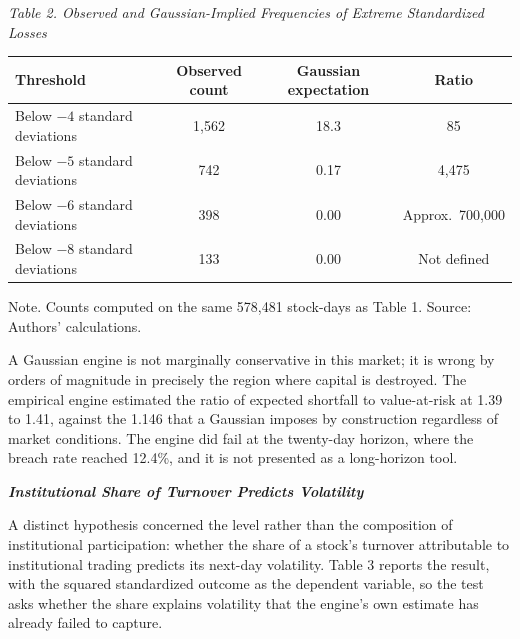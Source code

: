 \documentclass[12pt]{article}
\begin{document}
\begin{table}[htbp]
\centering
\emph{Table 2. Observed and Gaussian-Implied Frequencies of Extreme
Standardized Losses}
\vspace{0.3\baselineskip}
\begin{singlespace}
\begin{tabular}{lccc}
\toprule
Threshold & Observed count & Gaussian expectation & Ratio \\
\midrule
Below $-4$ standard deviations & 1,562 & 18.3 & 85 \\
Below $-5$ standard deviations & 742 & 0.17 & 4,475 \\
Below $-6$ standard deviations & 398 & 0.00 & Approx.\ 700,000 \\
Below $-8$ standard deviations & 133 & 0.00 & Not defined \\
\bottomrule
\end{tabular}
\end{singlespace}
\vspace{0.3\baselineskip}
\begin{singlespace}
\RaggedRight
Note. Counts computed on the same 578,481 stock-days as Table 1.
Source: Authors' calculations.
\end{singlespace}
\end{table}

A Gaussian engine is not marginally conservative in this market; it is wrong
by orders of magnitude in precisely the region where capital is destroyed. The
empirical engine estimated the ratio of expected shortfall to value-at-risk at
1.39 to 1.41, against the 1.146 that a Gaussian imposes by construction
regardless of market conditions. The engine did fail at the twenty-day
horizon, where the breach rate reached 12.4\%, and it is not presented as a
long-horizon tool.

\textbf{\emph{Institutional Share of Turnover Predicts Volatility}}

A distinct hypothesis concerned the level rather than the composition of
institutional participation: whether the share of a stock's turnover
attributable to institutional trading predicts its next-day volatility.
Table 3 reports the result, with the squared standardized outcome as the
dependent variable, so the test asks whether the share explains volatility
that the engine's own estimate has already failed to capture.
\end{document}
